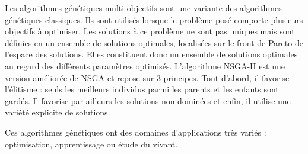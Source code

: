 \documentclass[draft]{llncs}
\begin{document}
Les algorithmes génétiques multi-objectifs sont une variante des algorithmes génétiques classiques.
Ils sont utilisés lorsque le problème posé comporte plusieurs objectifs à optimiser.
Les solutions à ce problème ne sont pas uniques mais sont définies en un ensemble de solutions optimales, localisées sur le front de Pareto de l'espace des solutions.
Elles constituent donc un ensemble de solutions optimales au regard des différents paramètres optimisés.
L'algorithme NSGA-II\cite{Deb:2002:FEM:2221359.2221582} est une version améliorée de NSGA et repose sur 3 principes.
Tout d'abord, il favorise l'élitisme : seuls les meilleurs individus parmi les parents et les enfants sont gardés.
Il favorise par ailleurs les solutions non dominées et enfin, il utilise une variété explicite de solutions.

Ces algorithmes génétiques ont des domaines d'applications très variés : optimisation, apprentissage ou étude du vivant.







\end{document}
